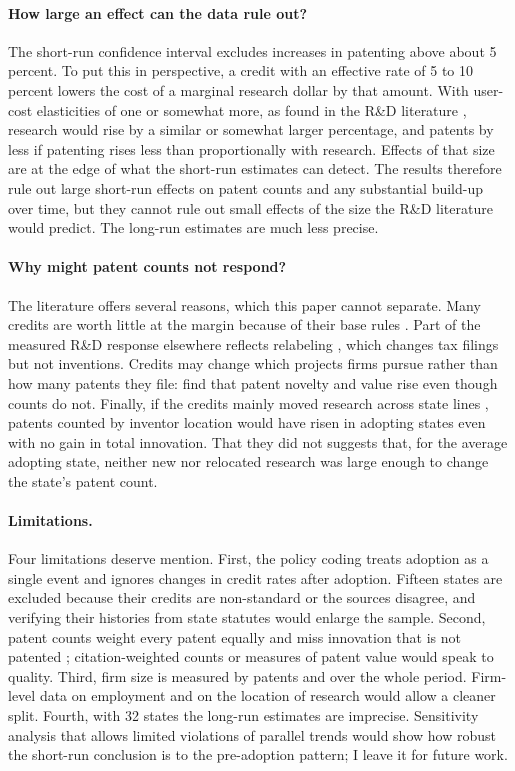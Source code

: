 \documentclass[12pt]{article}
\begin{document}
\paragraph{How large an effect can the data rule out?} The short-run confidence interval excludes increases in
patenting above about 5 percent. To put this in perspective, a credit with an effective rate of 5 to 10 percent
lowers the cost of a marginal research dollar by that amount. With user-cost elasticities of one or somewhat more, as
found in the R\&D literature \citep{hall1993rd,guceri2019effectiveness}, research would rise by a similar or
somewhat larger percentage,
and patents by less if patenting rises less than proportionally with research. Effects of that size are at the
edge of what the short-run estimates can detect. The results therefore rule out large short-run effects on
patent counts and any substantial build-up over time, but they cannot rule out small effects of the size the
R\&D literature would predict. The long-run estimates are much less precise.

\paragraph{Why might patent counts not respond?} The literature offers several reasons, which this paper cannot
separate. Many credits are worth little at the margin because of their base rules
\citep{wilson2009beggar,rao2026tax}. Part of the measured R\&D response elsewhere reflects relabeling
\citep{chen2021notching}, which changes tax filings but not inventions. Credits may change which projects firms
pursue rather than how many patents they file: \citet{melnik2024rd} find that patent novelty and value rise
even though counts do not. Finally, if the credits mainly moved research across state lines
\citep{wilson2009beggar,moretti2014state}, patents counted by inventor location would have risen in adopting
states even with no gain in total innovation. That they did not suggests that, for the average adopting state,
neither new nor relocated research was large enough to change the state's patent count.

\paragraph{Limitations.} Four limitations deserve mention. First, the policy coding treats adoption as a single
event and ignores changes in credit rates after adoption. Fifteen states are excluded because their credits are
non-standard or the sources disagree, and verifying their histories from state statutes would enlarge the
sample. Second, patent counts weight every patent equally and miss innovation that is not patented
\citep{griliches1990patent}; citation-weighted counts or measures of patent value would speak to quality.
Third, firm size is measured by patents and over the whole period. Firm-level data on employment and on the
location of research would allow a cleaner split. Fourth, with 32 states the long-run estimates are imprecise.
Sensitivity analysis that allows limited violations of parallel trends \citep{rambachan2023credible} would
show how robust the short-run conclusion is to the pre-adoption pattern; I leave it for future work.
\end{document}
